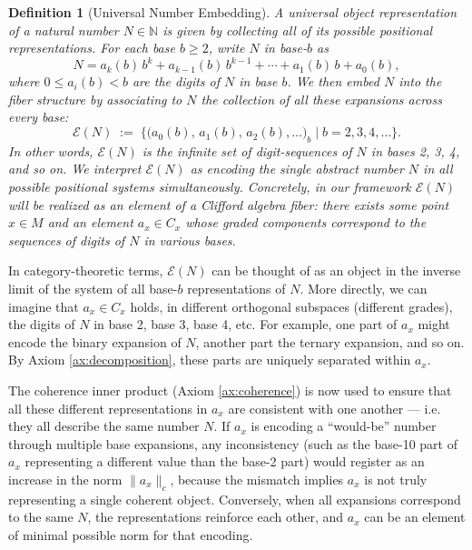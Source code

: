 \documentclass[11pt]{article}
\newtheorem{definition}{Definition}[section]
\begin{document}
\begin{definition}[Universal Number Embedding]\label{def:UOR}
A \emph{universal object representation} of a natural number $N \in \mathbb{N}$ is given by collecting all of its possible positional representations. For each base $b \ge 2$, write $N$ in base-$b$ as 
\[ N = a_k(b)\,b^k + a_{k-1}(b)\,b^{k-1} + \cdots + a_1(b)\,b + a_0(b), \] 
where $0 \le a_i(b) < b$ are the digits of $N$ in base $b$. We then embed $N$ into the fiber structure by associating to $N$ the collection of all these expansions across every base:
\[ 
\mathcal{E}(N) \;:=\; \Big\{ \big(a_0(b),\, a_1(b),\, a_2(b),\dots\big)_b \;\Big|\; b = 2,3,4,\dots \Big\}. 
\] 
In other words, $\mathcal{E}(N)$ is the infinite set of digit-sequences of $N$ in bases 2, 3, 4, and so on. We interpret $\mathcal{E}(N)$ as encoding the single abstract number $N$ in all possible positional systems simultaneously. Concretely, in our framework $\mathcal{E}(N)$ will be realized as an element of a Clifford algebra fiber: there exists some point $x \in M$ and an element $a_x \in C_x$ whose graded components correspond to the sequences of digits of $N$ in various bases.
\end{definition}

In category-theoretic terms, $\mathcal{E}(N)$ can be thought of as an object in the inverse limit of the system of all base-$b$ representations of $N$. More directly, we can imagine that $a_x \in C_x$ holds, in different orthogonal subspaces (different grades), the digits of $N$ in base 2, base 3, base 4, etc. For example, one part of $a_x$ might encode the binary expansion of $N$, another part the ternary expansion, and so on. By Axiom \ref{ax:decomposition}, these parts are uniquely separated within $a_x$.

The coherence inner product (Axiom \ref{ax:coherence}) is now used to ensure that all these different representations in $a_x$ are consistent with one another — i.e. they all describe the same number $N$. If $a_x$ is encoding a “would-be” number through multiple base expansions, any inconsistency (such as the base-10 part of $a_x$ representing a different value than the base-2 part) would register as an increase in the norm $\|a_x\|_c$, because the mismatch implies $a_x$ is not truly representing a single coherent object. Conversely, when all expansions correspond to the same $N$, the representations reinforce each other, and $a_x$ can be an element of minimal possible norm for that encoding.
\end{document}
